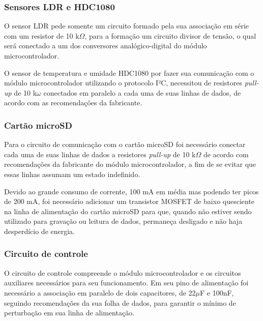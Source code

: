 
\subsubsection{Sensores LDR e HDC1080}

O sensor LDR pede somente um circuito formado pela sua associação em série com um resistor de 10 k$\Omega$, para a formação um circuito divisor de tensão, o qual será conectado a um dos conversores analógico-digital do módulo microcontrolador.

O sensor de temperatura e umidade HDC1080 por fazer sua comunicação com o módulo microcontrolador utilizando o protocolo I²C, necessitou de resistores \textit{pull-up} de 10 k$\omega$ conectados em paralelo a cada uma de suas linhas de dados, de acordo com as recomendações da fabricante.


\subsubsection{Cartão microSD}

Para o circuito de comunicação com o cartão microSD foi necessário conectar cada uma de suas linhas de dados a resistores \textit{pull-up} de 10 k$\Omega$ de acordo com recomendações da fabricante do módulo microcontrolador, a fim de se evitar que essas linhas assumam um estado indefinido. 

Devido ao grande consumo de corrente, 100 mA em média mas podendo ter picos de 200 mA, foi necessário adicionar um transistor MOSFET de baixo quesciente na linha de alimentação do cartão microSD para que, quando não estiver sendo utilizado para gravação ou leitura de dados, permaneça desligado e não haja desperdício de energia.

\subsubsection{Circuito de controle}


O circuito de controle compreende o módulo microcontrolador e os circuitos auxiliares necessários para seu funcionamento. Em seu pino de alimentação foi necessário a associação em paralelo de dois capacitores, de 22$\mu$F e 100nF, seguindo recomendações da sua folha de dados, para garantir o mínimo de perturbação em sua linha de alimentação. 

